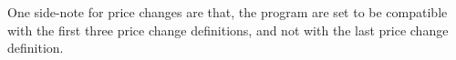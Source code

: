 One side-note for price changes are that, the program are set to be compatible with the first three price change definitions, and not with the last price change definition.

%
%
